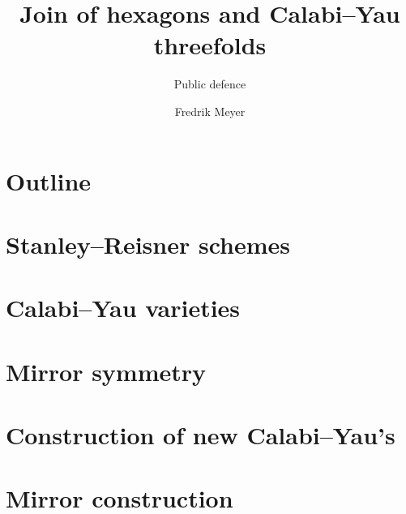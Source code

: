 \documentclass[UKenglish]{beamer}
\title{Join of hexagons and {Calabi--Yau} threefolds}
\subtitle{Public defence}
\author{Fredrik Meyer}
\begin{document}
\section{Outline}


\section{Stanley--Reisner schemes}


\section{Calabi--Yau varieties}



\section{Mirror symmetry}



\section{Construction of new Calabi--Yau's}



\section{Mirror construction}


\end{document}
